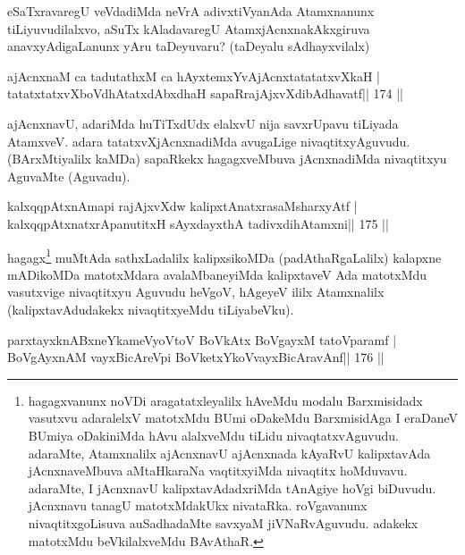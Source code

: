 \begin{artha}
eSaTxravaregU veVdadiMda neVrA adivxtiVyanAda Atamxnanunx tiLiyuvudilalxvo, aSuTx kAladavaregU AtamxjAcnxnakAkxgiruva anavxyAdigaLanunx yAru taDeyuvaru? (taDeyalu sAdhayxvilalx)
\end{artha}

\begin{shl}
ajAcnxnaM ca tadutathxM ca hAyxtemxYvAjAcnxtatatatxvXkaH |
tatatxtatxvXboVdhAtatxdAbxdhaH sapaRrajAjxvXdibAdhavatf\hfill || 174 ||
\end{shl}

\begin{artha}
ajAcnxnavU, adariMda huTiTxdUdx elalxvU nija savxrUpavu tiLiyada  AtamxveV. adara tatatxvXjAcnxnadiMda avugaLige nivaqtitxyAguvudu.  (BArxMtiyalilx kaMDa) sapaRkekx hagagxveMbuva jAcnxnadiMda nivaqtitxyu  AguvaMte (Aguvadu).
\end{artha}


\begin{shl}
kalxqqpAtxnAmapi rajAjxvXdw kalipxtAnatxrasaMsharxyAtf |
kalxqqpAtxnatxrApanutitxH sAyxdayxthA tadivxdihA\s\s tamxni\hfill || 175 ||
\end{shl}

\begin{artha}
hagagx\footnote{hagagxvanunx noVDi aragatatxleyalilx hAveMdu modalu 
Barxmisidadx vasutxvu adaralelxV matotxMdu BUmi oDakeMdu BarxmisidAga I 
eraDaneV BUmiya oDakiniMda hAvu alalxveMdu tiLidu nivaqtatxvAguvudu. 
adaraMte, Atamxnalilx ajAcnxnavU ajAcnxnada kAyaRvU kalipxtavAda 
jAcnxnaveMbuva aMtaHkaraNa vaqtitxyiMda nivaqtitx hoMduvavu. adaraMte, 
I jAcnxnavU kalipxtavAdadxriMda tAnAgiye hoVgi biDuvudu. jAcnxnavu tanagU matotxMdakUkx nivataRka. roVgavanunx nivaqtitxgoLisuva auSadhadaMte savxyaM jiVNaRvAguvudu. adakekx matotxMdu beVkilalxveMdu BAvAthaR.} muMtAda sathxLadalilx kalipxsikoMDa (padAthaRgaLalilx) kalapxne mADikoMDa matotxMdara avalaMbaneyiMda kalipxtaveV Ada matotxMdu vasutxvige nivaqtitxyu Aguvudu heVgoV, hAgeyeV ililx Atamxnalilx (kalipxtavAdudakekx nivaqtitxyeMdu tiLiyabeVku).
\end{artha}

\begin{shl}
parxtayxknABxneYkameVyoV\s toV BoVkAtx BoVgayxM tatoV\s paramf |
BoVgAyxnAM vayxBicAreV\s pi BoVketxYkoV\s vayxBicAravAnf\hfill || 176 ||
\end{shl}

